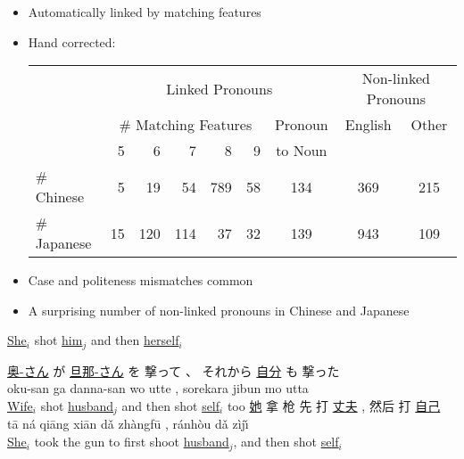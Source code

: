 \documentclass[a4paper,landscape,headrule,footrule,dvips]{foils}
\begin{document}
\begin{CJK}{UTF8}{min}
       \begin{itemize}
       \item Automatically linked by matching features
       \item Hand corrected:\\
\hspace*{-3em}
  \begin{tabular}[t]{lrrrrrccc}
 & \multicolumn{6}{c}{Linked Pronouns} & \multicolumn{2}{c}{Non-linked Pronouns} \\
 &\multicolumn{5}{c}{\# Matching Features} & Pronoun & English & Other \\
 & 5 & 6 & 7 & 8 & 9 & to Noun & & \\
\hline
\# Chinese   & 5 & 19 & 54 & 789 & 58 & 134 & 369 & 215 \\
\# Japanese  & 15 & 120 & 114 & 37 & 32 & 139 & 943 & 109
  \end{tabular}
\item Case and politeness mismatches common
\item A surprising number of non-linked pronouns in Chinese and Japanese
\end{itemize}



\begin{exe}
  \ex \ul{She}$_i$ shot \ul{him}$_j$ and then \ul{herself}$_i$
  \begin{xlist}
    \ex \gll \ul{奥-さん} が \ul{旦那-さん} を 撃って 、 それから \ul{自分} も 撃った \\
    oku-san ga danna-san wo utte , sorekara jibun mo utta \\
    \trans \ul{Wife}$_i$ shot \ul{husband}$_j$ and then shot \ul{self}$_i$ too
    \ex  \gll \ul{她} 拿 枪  先 打 \ul{丈夫} , 然后 打 \ul{自己}\\
    t\={a} ná qi\={a}ng xi\={a}n d\v{a} zhàngf\={u} , ránh\`{o}u d\v{a} zìj\v{\i} \\
    \trans \ul{She}$_i$ took the gun to first shoot \ul{husband}$_j$, and then shot \ul{self}$_i$
  \end{xlist}
\newpage


\end{exe}
\end{CJK}
\end{document}
